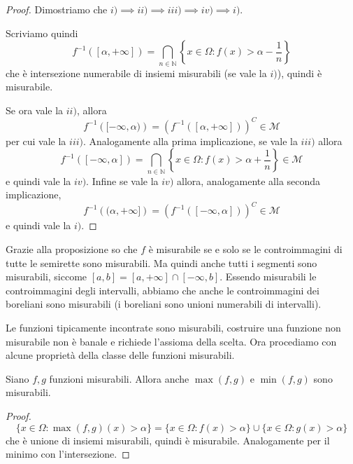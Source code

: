 \begin{proof}
    Dimostriamo che \(i) \implies ii) \implies iii) \implies iv) \implies i)\).
    
    Scriviamo quindi
    \[f ^{-1}\left( [\alpha, +\infty] \right) = \bigcap_{n \in \mathbb{N}}  \left\{x \in \Omega :
    f(x) > \alpha - \frac{1}{n}\right\}\] che è intersezione numerabile di
    insiemi misurabili (se vale la \(i)\)), quindi è misurabile.
    
    Se ora vale la \(ii)\), allora 
    \[
        f ^{-1} \left( [-\infty, \alpha) \right) = \left( f ^{-1} \left(
        [\alpha, +\infty] \right) \right)^{C} \in \mathcal{M}
    \]
    per cui vale la \(iii)\). Analogamente alla prima implicazione, se vale la \(iii)\) allora 
    \[
        f ^{-1} \left( [-\infty, \alpha] \right) = \bigcap_{n \in \mathbb{N}}  \left\{x \in \Omega :
        f(x) > \alpha + \frac{1}{n}\right\} \in \mathcal{M}
    \]
    e quindi vale la \(iv)\). Infine se vale la \(iv)\) allora, analogamente
    alla seconda implicazione,
    \[
        f ^{-1} \left( (\alpha, +\infty] \right) = \left( f ^{-1} \left(
        [-\infty, \alpha] \right) \right)^{C} \in \mathcal{M}
    \]
    e quindi vale la \(i)\).
\end{proof}

Grazie alla proposizione so che \(f\) è misurabile se e solo se le
controimmagini di tutte le semirette sono misurabili. Ma quindi anche tutti i
segmenti sono misurabili, siccome \([a, b] = [a, +\infty] \cap [-\infty, b]\).
Essendo misurabili le controimmagini degli intervalli, abbiamo che anche le
controimmagini dei boreliani sono misurabili (i boreliani sono unioni numerabili
di intervalli). 

Le funzioni tipicamente incontrate sono misurabili, costruire una funzione non
misurabile non è banale e richiede l'assioma della scelta. Ora procediamo con
alcune proprietà della classe delle funzioni misurabili.
\begin{proposition}
    Siano \(f,g\) funzioni misurabili. Allora anche \(\max(f, g)\) e \(\min(f,
    g)\) sono misurabili.
\end{proposition}
\begin{proof}
    \[
        \{x \in \Omega : \max(f, g) (x) > \alpha\} = \{x \in \Omega : f(x) >
        \alpha \} \cup \{x \in \Omega : g(x) > \alpha\} 
    \]
    che è unione di insiemi misurabili, quindi è misurabile. Analogamente per il
    minimo con l'intersezione.
\end{proof}

